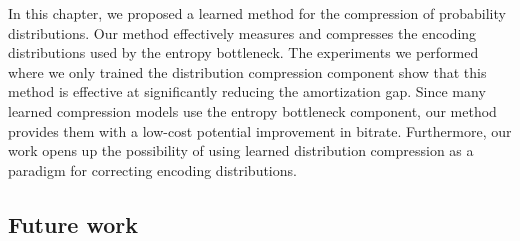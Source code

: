 
In this chapter, we proposed a learned method for the compression of probability distributions.
Our method effectively measures and compresses the encoding distributions used by the entropy bottleneck.
The experiments we performed where we only trained the distribution compression component show that this method is effective at significantly reducing the amortization gap.
Since many learned compression models use the entropy bottleneck component, our method provides them with a low-cost potential improvement in bitrate.
Furthermore, our work opens up the possibility of using learned distribution compression as a paradigm for correcting encoding distributions.





%
%
%
%
%
%
%
%
%


%

%




\subsection{Future work}
\label{sec:pdf_compression/conclusion/future_work}

